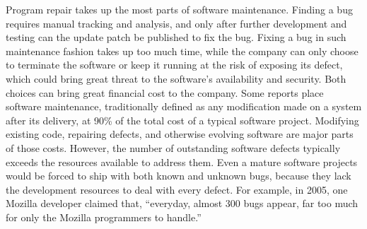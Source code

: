 \documentclass[10pt,journal,final,]{article}
\theoremstyle{definition}
\begin{document}
Program repair takes up the most parts of software maintenance. Finding a bug requires manual tracking and analysis, and only after further development and testing can the update patch be published to fix the bug\cite{SCaMC}.
Fixing a bug in such maintenance fashion takes up too much time, while the company can only choose to terminate the software or keep it running at the risk of exposing its defect, which could bring great threat to the software's availability and security. Both choices can bring great financial cost to the company\cite{CMfFSLCP}.
Some reports place software maintenance, traditionally defined as any modification made on a system after its delivery, at 90\% of the total cost of a typical software project\cite{CMfFSLCP}.
Modifying existing code, repairing defects, and otherwise evolving software are major parts of those costs\cite{AiSE}.
However, the number of outstanding software defects typically exceeds the resources available to address them.
Even a mature software projects would be forced to ship with both known and unknown bugs, because they lack the development resources to deal with every defect. For example, in 2005, one Mozilla developer claimed that, “everyday, almost 300 bugs appear, far too much for only the Mozilla programmers to handle.”
\end{document}
